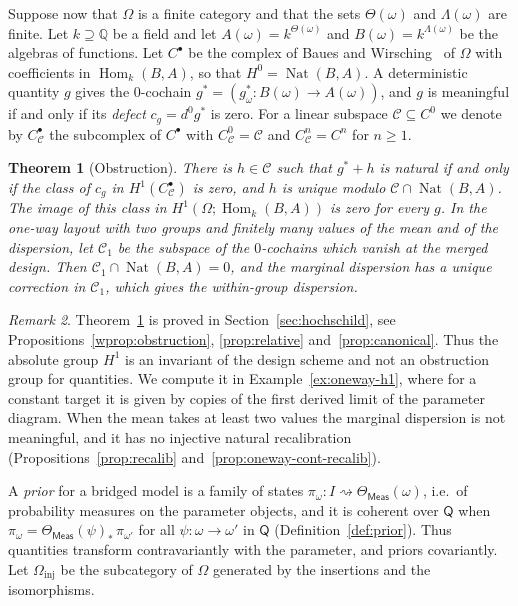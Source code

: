 \documentclass[11pt,a4paper]{article}
\theoremstyle{plain}
\newtheorem{theorem}{Theorem}[section]
\theoremstyle{definition}
\theoremstyle{remark}
\newtheorem{remark}[theorem]{Remark}
\newcommand{\cat}[1]{\mathsf{#1}}
\newcommand{\catO}{\cat{\Omega}}
\newcommand{\Meas}{\cat{Meas}}
\DeclareMathOperator{\Nat}{Nat}
\DeclareMathOperator{\Hom}{Hom}
\begin{document}
Suppose now that $\catO$ is a finite category and that the sets
$\Theta(\omega)$ and $\Lambda(\omega)$ are finite. Let $k \supseteq \mathbb{Q}$
be a field and let $A(\omega) = k^{\Theta(\omega)}$ and
$B(\omega) = k^{\Lambda(\omega)}$ be the algebras of functions. Let
$C^{\bullet}$ be the complex of Baues and
Wirsching~\cite{baues_cohomology_1985} of $\catO$ with coefficients in
$\Hom_k(B,A)$, so that $H^{0} = \Nat(B,A)$. A deterministic quantity $g$ gives
the $0$-cochain $g^{*} = (g_{\omega}^{*} \colon B(\omega) \to A(\omega))$, and
$g$ is meaningful if and only if its \emph{defect} $c_g = d^{0}g^{*}$ is zero.
For a linear subspace $\mathcal{C} \subseteq C^{0}$ we denote by
$C^{\bullet}_{\mathcal{C}}$ the subcomplex of $C^{\bullet}$ with
$C^{0}_{\mathcal{C}} = \mathcal{C}$ and $C^{n}_{\mathcal{C}} = C^{n}$ for
$n \ge 1$.

\begin{theorem}[Obstruction]\label{thm:main-obstruction}
There is $h \in \mathcal{C}$ such that $g^{*} + h$ is natural if and only if
the class of $c_g$ in $H^{1}(C^{\bullet}_{\mathcal{C}})$ is zero, and $h$ is
unique modulo $\mathcal{C} \cap \Nat(B,A)$. The image of this class in
$H^{1}(\catO;\Hom_k(B,A))$ is zero for every $g$. In the one-way layout with
two groups and finitely many values of the mean and of the dispersion, let
$\mathcal{C}_{1}$ be the subspace of the $0$-cochains which vanish at the
merged design. Then $\mathcal{C}_{1} \cap \Nat(B,A) = 0$, and the marginal
dispersion has a unique correction in $\mathcal{C}_{1}$, which gives the
within-group dispersion.
\end{theorem}

\begin{remark}\label{rem:main-obstruction}
Theorem~\ref{thm:main-obstruction} is proved in Section~\ref{sec:hochschild},
see Propositions~\ref{wprop:obstruction}, \ref{prop:relative}
and~\ref{prop:canonical}. Thus the absolute group $H^{1}$ is an invariant of
the design scheme and not an obstruction group for quantities. We compute it
in Example~\ref{ex:oneway-h1}, where for a constant target it is given by
copies of the first derived limit of the parameter diagram. When the mean takes
at least two values the marginal dispersion is not meaningful, and it has no
injective natural recalibration (Propositions~\ref{prop:recalib}
and~\ref{prop:oneway-cont-recalib}).
\end{remark}

A \emph{prior} for a bridged model is a family of states
$\pi_{\omega} \colon I \rightsquigarrow \Theta_\Meas(\omega)$, i.e.\ of
probability measures on the parameter objects, and it is coherent over
$\cat{Q}$ when $\pi_{\omega} = \Theta_\Meas(\psi)_{*}\,\pi_{\omega'}$ for all
$\psi \colon \omega \to \omega'$ in $\cat{Q}$ (Definition~\ref{def:prior}).
Thus quantities transform contravariantly with the parameter, and priors
covariantly. Let $\catO_{\mathrm{inj}}$ be the subcategory of $\catO$
generated by the insertions and the isomorphisms.
\end{document}
